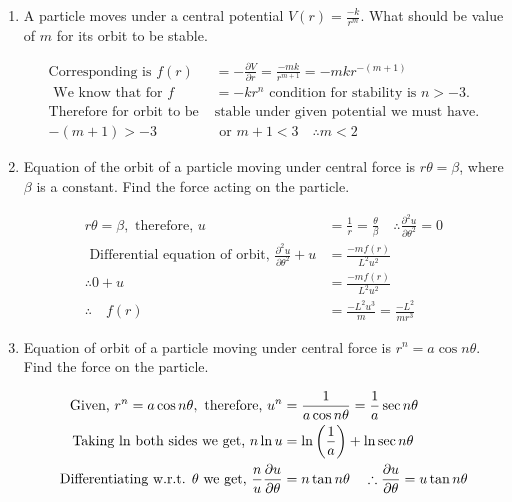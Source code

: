 \begin{enumerate}
		\item  A particle moves under a central potential $V(r)=\frac{-k}{r^{m}} .$ What should be value of $m$ for its orbit to be stable.
	\begin{answer}
		\begin{align*}
		\text{Corresponding is }f(r)&=-\frac{\partial V}{\partial r}=\frac{-m k}{r^{m+1}}=-m k r^{-(m+1)}\\
		\text{	We know that for }f&=-k r^{n}\text{ condition for stability is $n>-3$.} \\
		\text{Therefore for orbit to be }&\text{stable under given potential we must have.}\\
		-(m+1)>-3&\text{ or }m+1<3 \quad \therefore m<2
		\end{align*}
	\end{answer}
	\item  Equation of the orbit of a particle moving under central force is $r \theta=\beta$, where $\beta$ is a constant. Find the force acting on the particle.
\begin{answer}
	\begin{align*}
	r \theta=\beta,\text{ therefore, }u&=\frac{1}{r}=\frac{\theta}{\beta} \quad \therefore \frac{\partial^{2} u}{\partial \theta^{2}}=0\\
	\text{	Differential equation of orbit, }\frac{\partial^{2} u}{\partial \theta^{2}}+u&=\frac{-m f(r)}{L^{2} u^{2}}\\
	\therefore 0+u&=\frac{-m f(r)}{L^{2} u^{2}} \quad\\ 
	\therefore \quad f(r)&=\frac{-L^{2} u^{3}}{m}=\frac{-L^{2}}{m r^{3}}
	\end{align*}
\end{answer}
\item  Equation of orbit of a particle moving under central force is $r^{n}=a \cos n \theta .$ Find the force on the particle.
\begin{answer}
	\begin{align}
	\text{	Given, }r^{n}=a \cos n \theta,\text{ therefore, }u^{n}&=\frac{1}{a \cos n \theta}=\frac{1}{a} \sec n \theta \label{25}\\
	\text{ Taking $\ln$ both sides we get, }n \ln u&=\ln \left(\frac{1}{a}\right)+\ln \sec n \theta\notag\\
	\text{Differentiating w.r.t. $\theta$ we get, }\frac{n}{u} \frac{\partial u}{\partial \theta}&=n \tan n \theta \quad \therefore \frac{\partial u}{\partial \theta}=u \tan n \theta\notag\\

\end{align}
\end{answer}
\end{enumerate}
